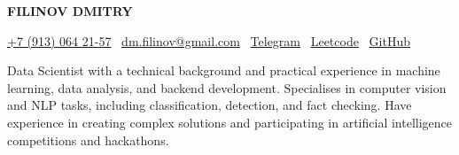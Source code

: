 \begin{center}
  {\huge\rmfamily\bfseries FILINOV DMITRY}
\end{center}
\begin{center}
\href{tel:+79130642157}{+7 (913) 064 21-57} \textbar\ 
\href{mailto:dm.filinov@gmail.com}{dm.filinov@gmail.com} \textbar\
  \href{https://t.me/D1ffic00lt}{Telegram} \textbar\ 
  \href{https://leetcode.com/u/D1ffic00lt/}{Leetcode} \textbar\ 
  \href{https://github.com/D1ffic00lt}{GitHub}
\end{center}
Data Scientist with a technical background and practical experience in machine learning, data analysis, and backend development. Specialises in computer vision and NLP tasks, including classification, detection, and fact checking. Have experience in creating complex solutions and participating in artificial intelligence competitions and hackathons.

